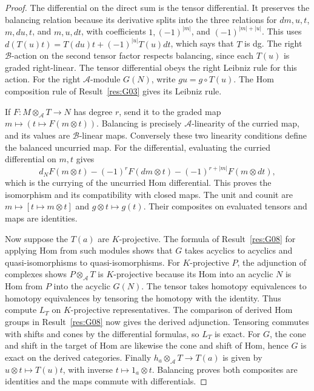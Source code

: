 \begin{proof}
The differential on the direct sum is the tensor differential.
It preserves the balancing relation because its derivative splits
into the three relations for \(dm,u,t\), \(m,du,t\), and \(m,u,dt\),
with coefficients \(1,(-1)^{|m|}\), and \((-1)^{|m|+|u|}\).
This uses
\(d(T(u)t)=T(du)t+(-1)^{|u|}T(u)dt\), which says that \(T\) is dg.
The right \(\mathcal B\)-action on the second tensor factor
respects balancing, since each \(T(u)\) is graded right-linear.
The tensor differential obeys the right Leibniz rule for this
action. For the right \(\mathcal A\)-module \(G(N)\), write
\(g u=g\circ T(u)\). The Hom composition rule of
Result~\ref{res:G03} gives its Leibniz rule.

If \(F:M\otimes_\mathcal A T\to N\) has degree \(r\), send it to
the graded map \(m\mapsto (t\mapsto F(m\otimes t))\). Balancing
is precisely \(\mathcal A\)-linearity of the curried map, and its
values are \(\mathcal B\)-linear maps. Conversely these two
linearity conditions define the balanced uncurried map.
For the differential, evaluating the curried differential
on \(m,t\) gives
\[
 d_N F(m\otimes t)-(-1)^r F(dm\otimes t)
       -(-1)^{r+|m|}F(m\otimes dt),
\]
which is the currying of the uncurried Hom differential.
This proves the isomorphism and its compatibility with closed
maps. The unit and counit are \(m\mapsto[t\mapsto m\otimes t]\)
and \(g\otimes t\mapsto g(t)\). Their composites on evaluated
tensors and maps are identities.

Now suppose the \(T(a)\) are \(K\)-projective. The formula of
Result~\ref{res:G08} for applying Hom from such modules shows
that \(G\) takes acyclics to acyclics and quasi-isomorphisms to
quasi-isomorphisms. For \(K\)-projective \(P\), the adjunction
of complexes shows \(P\otimes_\mathcal A T\) is \(K\)-projective
because its Hom into an acyclic \(N\) is Hom from \(P\) into the
acyclic \(G(N)\). The tensor takes homotopy equivalences to
homotopy equivalences by tensoring the homotopy with the identity.
Thus compute \(L_T\) on \(K\)-projective representatives.
The comparison of derived Hom groups in Result~\ref{res:G08}
now gives the derived adjunction. Tensoring commutes with shifts
and cones by the differential formulas, so \(L_T\) is exact.
For \(G\), the cone and shift in the target of Hom are likewise
the cone and shift of Hom, hence \(G\) is exact on the derived
categories. Finally \(h_a\otimes_\mathcal A T\to T(a)\) is
given by \(u\otimes t\mapsto T(u)t\), with inverse
\(t\mapsto 1_a\otimes t\). Balancing proves both composites are
identities and the maps commute with differentials.
\end{proof}


